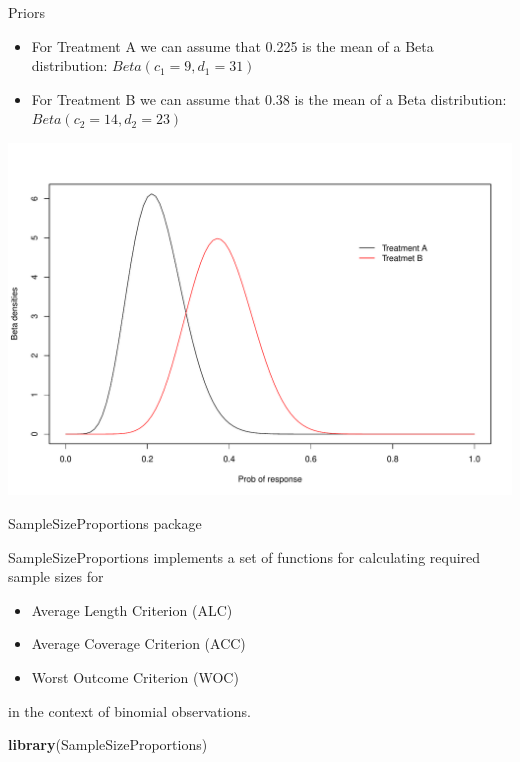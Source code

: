 \documentclass{beamer}
\newenvironment{Shaded}{}{}
\newcommand{\KeywordTok}[1]{\textcolor[rgb]{0.00,0.44,0.13}{\textbf{{#1}}}}
\newcommand{\NormalTok}[1]{{#1}}
\begin{document}
\begin{frame}{Priors}

\begin{itemize}
\itemsep1pt\parskip0pt
\item
  For Treatment A we can assume that 0.225 is the mean of a Beta
  distribution: \(Beta\left(c_{1}=9,d_{1}=31\right)\)
\item
  For Treatment B we can assume that 0.38 is the mean of a Beta
  distribution: \(Beta\left(c_{2}=14,d_{2}=23\right)\)
\end{itemize}

\includegraphics[scale=0.38]{09CaseStudy_files/figure-beamer/unnamed-chunk-3-1.pdf}

\end{frame}

\begin{frame}[fragile]{SampleSizeProportions package}

SampleSizeProportions implements a set of functions for calculating
required sample sizes for

\begin{itemize}
\itemsep1pt\parskip0pt
\item
  Average Length Criterion (ALC)
\item
  Average Coverage Criterion (ACC)
\item
  Worst Outcome Criterion (WOC)
\end{itemize}

in the context of binomial observations.

\begin{Shaded}
\begin{Highlighting}[]
\KeywordTok{library}\NormalTok{(SampleSizeProportions)}
\end{Highlighting}
\end{Shaded}

\end{frame}
\end{document}
